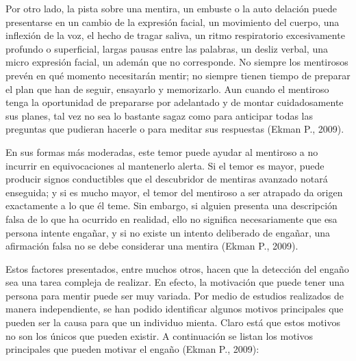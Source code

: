 Por otro lado, la pista sobre una mentira, un embuste o la auto delación puede presentarse en un cambio de la expresión facial, un movimiento del cuerpo, una inflexión de la voz, el hecho de tragar saliva, un ritmo respiratorio excesivamente profundo o superficial, largas pausas entre las palabras, un desliz verbal, una micro expresión facial, un ademán que no corresponde. No siempre los mentirosos prevén en qué momento necesitarán mentir; no siempre tienen tiempo de preparar el plan que han de seguir, ensayarlo y memorizarlo. Aun cuando el mentiroso tenga la oportunidad de prepararse por adelantado y de montar cuidadosamente sus planes, tal vez no sea lo bastante sagaz como para anticipar todas las preguntas que pudieran hacerle o para meditar sus respuestas (Ekman P., 2009).

En sus formas más moderadas, este temor puede ayudar al mentiroso a no incurrir en equivocaciones al mantenerlo alerta. Si el temor es mayor, puede producir signos conductibles que el descubridor de mentiras avanzado notará enseguida; y si es mucho mayor, el temor del mentiroso a ser atrapado da origen exactamente a lo que él teme. Sin embargo, si alguien presenta una descripción falsa de lo que ha ocurrido en realidad, ello no significa necesariamente que esa persona intente engañar, y si no existe un intento deliberado de engañar, una afirmación falsa no se debe considerar una mentira (Ekman P., 2009).

Estos factores presentados, entre muchos otros, hacen que la detección del engaño sea una tarea compleja de realizar. En efecto, la motivación que puede tener una persona para mentir puede ser muy variada. Por medio de estudios realizados de manera independiente, se han podido identificar algunos motivos principales que pueden ser la causa para que un individuo mienta. Claro está que estos motivos no son los únicos que pueden existir. A continuación se listan los motivos principales que pueden motivar el engaño (Ekman P., 2009):

